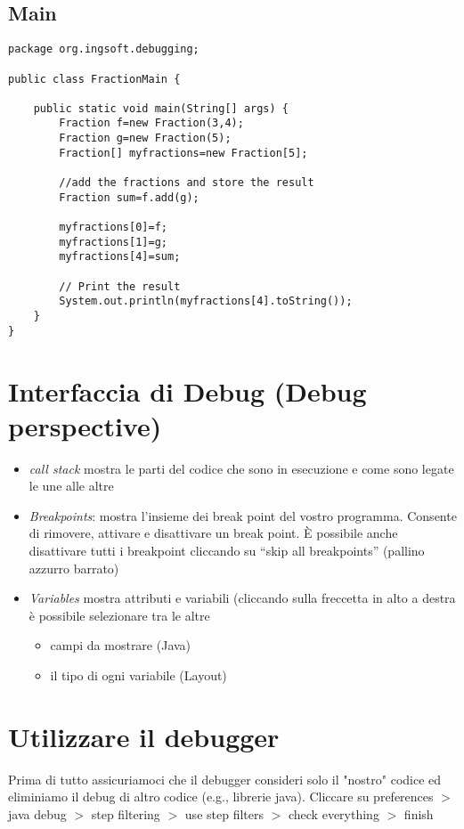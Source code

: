 \documentclass{article}
\begin{document}
\subsection{Main}
\begin{lstlisting}
package org.ingsoft.debugging;

public class FractionMain {

	public static void main(String[] args) {
		Fraction f=new Fraction(3,4);
		Fraction g=new Fraction(5);
		Fraction[] myfractions=new Fraction[5];
		
		//add the fractions and store the result
		Fraction sum=f.add(g);
		
		myfractions[0]=f;
		myfractions[1]=g;
		myfractions[4]=sum;
		
		// Print the result
		System.out.println(myfractions[4].toString());
	}
}
\end{lstlisting}


\section{Interfaccia di Debug (Debug perspective)}
\begin{itemize}
\item \emph{call stack} mostra le parti del codice che sono in esecuzione e come sono legate le une alle altre
\item \emph{Breakpoints}: mostra l'insieme dei break point del vostro programma. Consente di rimovere, attivare e disattivare un break point. \`E possibile anche disattivare tutti i breakpoint cliccando su ``skip all breakpoints'' (pallino azzurro barrato)
\item \emph{Variables} mostra attributi e variabili (cliccando sulla freccetta in alto a destra \`e possibile selezionare  tra le altre
\begin{itemize}
\item campi da mostrare (Java)
\item il tipo di ogni variabile (Layout)
\end{itemize}
\end{itemize}


\section{Utilizzare il debugger}
Prima di tutto assicuriamoci che il debugger consideri solo il "nostro" codice ed eliminiamo il  debug di altro codice (e.g., librerie java).
Cliccare su preferences $>$ java debug $>$ step filtering $>$ use step filters $>$ check everything $>$ finish
\end{document}
